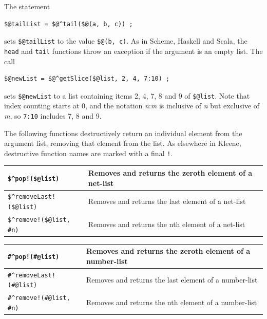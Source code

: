 \documentclass[letterpaper,12pt]{article}
\begin{document}
\vspace{.5cm}

\noindent
The statement

\begin{Verbatim}[fontsize=\small]
$@tailList = $@^tail($@(a, b, c)) ;
\end{Verbatim}

\noindent
sets \verb!$@tailList! to the value \verb!$@(b, c)!.  As in Scheme,
Haskell and Scala, the \texttt{head} and \texttt{tail} functions throw an
exception if the argument is an empty list.  The call

\begin{Verbatim}[fontsize=\small]
$@newList = $@^getSlice($@list, 2, 4, 7:10) ;
\end{Verbatim}

\noindent
sets \verb!$@newList! to a list containing items 2, 4, 7, 8 and 9 of
\verb!$@list!.  Note that index counting starts at 0, and the notation
\emph{n}:\emph{m} is inclusive of \emph{n} but exclusive of \emph{m}, so
\texttt{7:10} includes 7, 8 and 9.

The following functions destructively return an individual element from
the argument list, removing that element from the list.  As elsewhere in
Kleene, destructive function names are marked with a final \verb+!+.

\vspace{.5cm}

\noindent
\begin{tabular}{|l|p{6cm}|}
\hline
\verb+$^pop!($@list)+ & Removes and returns the zeroth element of a net-list\\
\hline
\verb+$^removeLast!($@list)+ & Removes and returns the last element of a net-list\\
\hline
\verb+$^remove!($@list, #n)+ & Removes and returns the nth element of a net-list\\
\hline
\end{tabular}

\vspace{.5cm}

\noindent
\begin{tabular}{|l|p{6cm}|}
\hline
\verb+#^pop!(#@list)+ & Removes and returns the zeroth element of a number-list\\
\hline
\verb+#^removeLast!(#@list)+ & Removes and returns the last element of a number-list\\
\hline
\verb+#^remove!(#@list, #n)+ & Removes and returns the nth element of a number-list\\
\hline
\end{tabular}
\end{document}
